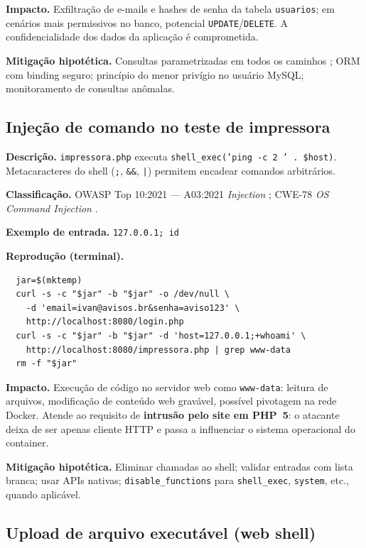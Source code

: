   \textbf{Impacto.} Exfiltração de e-mails e hashes de senha da tabela \texttt{usuarios}; em cenários
  mais permissivos no banco, potencial \texttt{UPDATE}/\texttt{DELETE}. A confidencialidade dos dados
  da aplicação é comprometida.
  
  \textbf{Mitigação hipotética.} Consultas parametrizadas em todos os caminhos \cite{phpPrepared,owasp};
  ORM com binding seguro; princípio do menor privígio no usuário MySQL; monitoramento de consultas
  anômalas.
  
  \subsection{Injeção de comando no teste de impressora}
  
  \textbf{Descrição.} \texttt{impressora.php} executa
  \texttt{shell\_exec('ping -c 2 ' . \$host)}. Metacaracteres do shell (\texttt{;}, \texttt{\&\&},
  \texttt{|}) permitem encadear comandos arbitrários.
  
  \textbf{Classificação.} OWASP Top 10:2021 --- A03:2021 \emph{Injection} \cite{owasp};
  CWE-78 \emph{OS Command Injection} \cite{cwe}.
  
  \textbf{Exemplo de entrada.} \texttt{127.0.0.1; id}
  
  \textbf{Reprodução (terminal).}
  \begin{lstlisting}
  jar=$(mktemp)
  curl -s -c "$jar" -b "$jar" -o /dev/null \
    -d 'email=ivan@avisos.br&senha=aviso123' \
    http://localhost:8080/login.php
  curl -s -c "$jar" -b "$jar" -d 'host=127.0.0.1;+whoami' \
    http://localhost:8080/impressora.php | grep www-data
  rm -f "$jar"
  \end{lstlisting}
  
  \textbf{Impacto.} Execução de código no servidor web como \texttt{www-data}: leitura de arquivos,
  modificação de conteúdo web gravável, possível pivotagem na rede Docker. Atende ao requisito de
  \textbf{intrusão pelo site em PHP~5}: o atacante deixa de ser apenas cliente HTTP e passa a
  influenciar o sistema operacional do container.
  
  \textbf{Mitigação hipotética.} Eliminar chamadas ao shell; validar entradas com lista branca; usar APIs
  nativas; \texttt{disable\_functions} para \texttt{shell\_exec}, \texttt{system}, etc., quando aplicável.
  
  \subsection{Upload de arquivo executável (web shell)}
  
